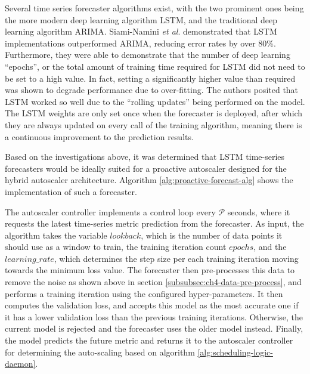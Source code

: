 Several time series forecaster algorithms exist, with the two prominent ones being the more modern deep learning algorithm LSTM, and the traditional deep learning algorithm ARIMA. Siami-Namini \textit{et al}. \cite{siami2018comparison} demonstrated that LSTM implementations outperformed ARIMA, reducing error rates by over 80\%. Furthermore, they were able to demonstrate that the number of deep learning ``epochs'', or the total amount of training time required for LSTM did not need to be set to a high value. In fact, setting a significantly higher value than required was shown to degrade performance due to over-fitting. The authors posited that LSTM worked so well due to the ``rolling updates'' being performed on the model. The LSTM weights are only set once when the forecaster is deployed, after which they are always updated on every call of the training algorithm, meaning there is a continuous improvement to the prediction results.\par

Based on the investigations above, it was determined that LSTM time-series forecasters would be ideally suited for a proactive autoscaler designed for the hybrid autoscaler architecture. Algorithm \ref{alg:proactive-forecast-alg} shows the implementation of such a forecaster.\par

The autoscaler controller implements a control loop every $\mathcal{P}$ seconds, where it requests the latest time-series metric prediction from the forecaster. As input, the algorithm takes the variable $lookback$, which is the number of data points it should use as a window to train, the training iteration count $epochs$, and the $learning\_rate$, which determines the step size per each training iteration moving towards the minimum loss value. The forecaster then pre-processes this data to remove the noise as shown above in section \ref{subsubsec:ch4-data-pre-process}, and performs a training iteration using the configured hyper-parameters. It then computes the validation loss, and accepts this model as the most accurate one if it has a lower validation loss than the previous training iterations. Otherwise, the current model is rejected and the forecaster uses the older model instead. Finally, the model predicts the future metric and returns it to the autoscaler controller for determining the auto-scaling based on algorithm \ref{alg:scheduling-logic-daemon}.\par


